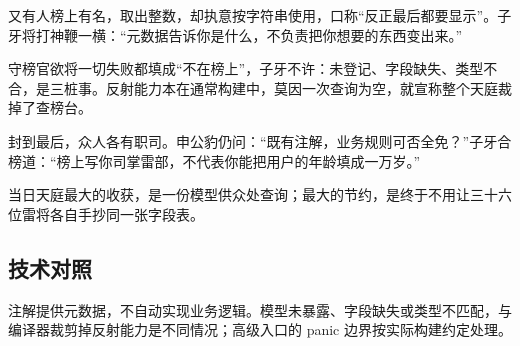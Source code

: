 又有人榜上有名，取出整数，却执意按字符串使用，口称“反正最后都要显示”。子牙将打神鞭一横：“元数据告诉你是什么，不负责把你想要的东西变出来。”

守榜官欲将一切失败都填成“不在榜上”，子牙不许：未登记、字段缺失、类型不合，是三桩事。反射能力本在通常构建中，莫因一次查询为空，就宣称整个天庭裁掉了查榜台。

封到最后，众人各有职司。申公豹仍问：“既有注解，业务规则可否全免？”子牙合榜道：“榜上写你司掌雷部，不代表你能把用户的年龄填成一万岁。”

当日天庭最大的收获，是一份模型供众处查询；最大的节约，是终于不用让三十六位雷将各自手抄同一张字段表。

\subsection*{技术对照}

注解提供元数据，不自动实现业务逻辑。模型未暴露、字段缺失或类型不匹配，与编译器裁剪掉反射能力是不同情况；高级入口的 panic 边界按实际构建约定处理。
